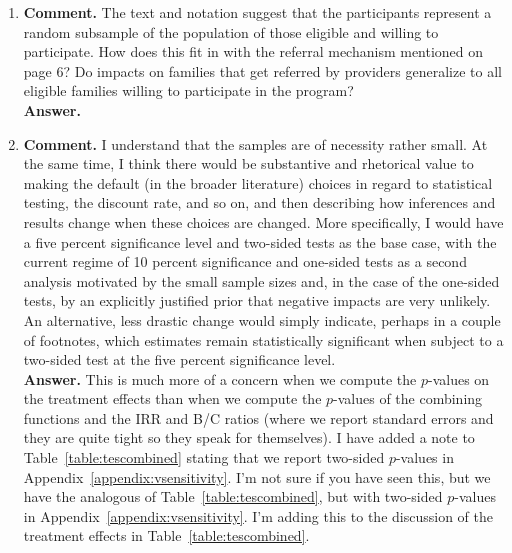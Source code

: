 


\usepackage[stable]{footmisc}

\newcommand*\leftright[2]{%
  \leavevmode
  \rlap{#1}%
  \hspace{0.5\linewidth}%
  #2}

\newcommand{\orth}{\ensuremath{\perp\!\!\!\perp}}%
\newcommand{\indep}{\orth}%
\newcommand{\notorth}{\ensuremath{\perp\!\!\!\!\!\!\diagup\!\!\!\!\!\!\perp}}%
\newcommand{\notindep}{\notorth}





\doublespacing

\begin{enumerate}

\item 

\noindent \textbf{Comment.} The text and notation suggest that the participants represent a random subsample of the population of those eligible and willing to participate. How does this fit in with the referral mechanism mentioned on page 6? Do impacts on families that get referred by providers generalize to all eligible families willing to participate in the program? \\

\noindent \textbf{Answer.}\\

\item
\noindent \textbf{Comment.} I understand that the samples are of necessity rather small. At the same time, I think there would be substantive and rhetorical value to making the default (in the broader literature) choices in regard to statistical testing, the discount rate, and so on, and then describing how inferences and results change when these choices are changed. More specifically, I would have a five percent significance level and two-sided tests as the base case, with the current regime of 10 percent significance and one-sided tests as a second analysis motivated by the small sample sizes and, in the case of the one-sided tests, by an explicitly justified prior that negative impacts are very unlikely. An alternative, less drastic change would simply indicate, perhaps in a couple of footnotes, which estimates remain statistically significant when subject to a two-sided test at the five percent significance level.\\

\noindent \textbf{Answer.} This is much more of a concern when we compute the $p$-values on the treatment effects than when we compute the $p$-values of the combining functions and the IRR and B/C ratios (where we report standard errors and they are quite tight so they speak for themselves). I have added a note to Table~\ref{table:tescombined} stating that we report two-sided $p$-values in Appendix~\ref{appendix:vsensitivity}. I'm not sure if you have seen this, but we have the analogous of Table~\ref{table:tescombined}, but with two-sided $p$-values in Appendix~\ref{appendix:vsensitivity}. I'm adding this to the discussion of the treatment effects in Table~\ref{table:tescombined}.\\


\end{enumerate}
